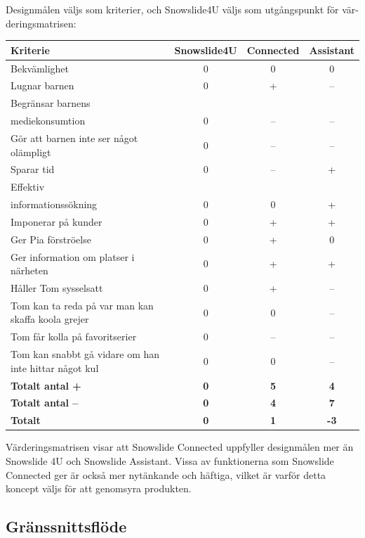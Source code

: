 \documentclass[a4paper,12pt,titlepage]{article}
\begin{document}
Designmålen väljs som kriterier, och Snowslide4U väljs som utgångspunkt för
vär-deringsmatrisen:

\renewcommand*{\arraystretch}{1.4}
\begin{longtable}[l]{p{4cm} c c c}
    \textbf{Kriterie} & \textbf{Snowslide4U} & \textbf{Connected} & \textbf{Assistant} \\ \midrule
    Bekvämlighet                                            & 0 & 0  & 0  \\ \midrule
    Lugnar barnen                                           & 0 & +  & -- \\ \midrule
    Begränsar barnens \\ mediekonsumtion                    & 0 & -- & -- \\ \midrule
    Gör att barnen inte ser något olämpligt                 & 0 & -- & -- \\ \midrule
    Sparar tid                                              & 0 & -- & +  \\ \midrule
    Effektiv \\ informationssökning                         & 0 & 0  & +  \\ \midrule
    Imponerar på kunder                                     & 0 & +  & +  \\ \midrule
    Ger Pia förströelse                                     & 0 & +  & 0  \\ \midrule
    Ger information om platser i närheten                   & 0 & +  & +  \\ \midrule
    Håller Tom sysselsatt                                   & 0 & +  & -- \\ \midrule
    Tom kan ta reda på var man kan skaffa koola grejer      & 0 & 0  & -- \\ \midrule
    Tom får kolla på favoritserier                          & 0 & -- & -- \\ \midrule
    Tom kan snabbt gå vidare om han inte hittar något kul   & 0 & 0  & -- \\ \midrule
    \textbf{Totalt antal + }      & \textbf{0} & \textbf{5}  & \textbf{4} \\ \midrule
    \textbf{Totalt antal --}      & \textbf{0} & \textbf{4}  & \textbf{7} \\ \midrule
    \textbf{Totalt}      & \textbf{0} & \textbf{1}  & \textbf{-3} \\
\end{longtable}

Värderingsmatrisen visar att Snowslide Connected uppfyller designmålen mer än
Snowslide 4U och Snowslide Assistant. Vissa av funktionerna som Snowslide
Connected ger är också mer nytänkande och häftiga, vilket är varför detta
koncept väljs för att genomsyra produkten.

\subsection*{Gränssnittsflöde}
\end{document}
